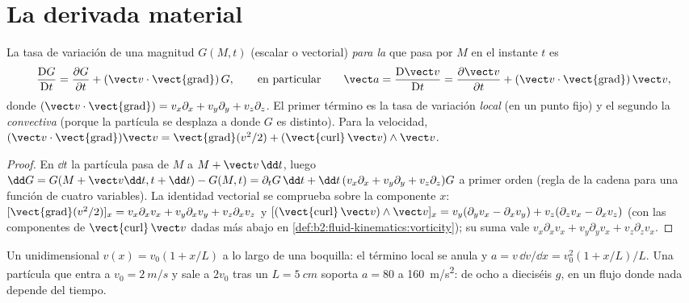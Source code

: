\section{La derivada material}

\begin{theorem}\label{thm:b2:fluid-kinematics:material}
La tasa de variación de una magnitud $G(M, t)$ (escalar o vectorial)
\emph{para la } que pasa por $M$ en el instante $t$ es
\[
\frac{\mathrm DG}{\mathrm Dt} = \frac{\partial G}{\partial t} + (\vect v\cdot
\operatorname{\vect{grad}})\,G ,
\qquad\text{en particular}\qquad
\vect a = \frac{\mathrm D\vect v}{\mathrm Dt} = \frac{\partial\vect v}{\partial t} +
(\vect v\cdot\operatorname{\vect{grad}})\,\vect v ,
\]
donde $(\vect v\cdot\operatorname{\vect{grad}}) = v_x\partial_x + v_y\partial_y +
v_z\partial_z$. El primer término es la tasa de variación \emph{local} (en un
punto fijo) y el segundo la \emph{convectiva} (porque la partícula se
desplaza a donde $G$ es distinto). Para la velocidad, $(\vect v\cdot
\operatorname{\vect{grad}})\vect v = \operatorname{\vect{grad}}(v^2/2) +
(\operatorname{\vect{curl}}\vect v)\wedge\vect v$.
\end{theorem}

\begin{proof}
En $\dd t$ la partícula pasa de $M$ a $M + \vect v\,\dd t$, luego $\dd G =
G(M + \vect v\dd t, t + \dd t) - G(M, t) = \partial_tG\,\dd t + \dd t\,(v_x\partial_x
+ v_y\partial_y + v_z\partial_z)G$ a primer orden (regla de la cadena para una
función de cuatro variables). La identidad vectorial se comprueba sobre la
componente $x$: $[\operatorname{\vect{grad}}(v^2/2)]_x = v_x\partial_xv_x + v_y\partial_x
v_y + v_z\partial_xv_z$ y $[(\operatorname{\vect{curl}}\vect v)\wedge\vect v]_x =
v_y(\partial_yv_x - \partial_xv_y) + v_z(\partial_zv_x - \partial_xv_z)$ (con las
componentes de $\operatorname{\vect{curl}}\vect v$ dadas más abajo en
\cref{def:b2:fluid-kinematics:vorticity}); su suma vale $v_x\partial_xv_x +
v_y\partial_yv_x + v_z\partial_zv_x$.
\end{proof}

\begin{example}\label{ex:b2:fluid-kinematics:nozzle}
Un  unidimensional $v(x) = v_0(1 + x/L)$ a lo largo de
una boquilla: el término local se anula y $a = v\,\dd v/\dd x = v_0^2(1 + x/L)/L$.
Una partícula que entra a $v_0 = \qty{2}{m/s}$ y sale a $2v_0$ tras un $L
= \qty{5}{cm}$ soporta $a = 80$ a \qty{160}{m/s^2}: de ocho a dieciséis $g$,
en un flujo donde nada depende del tiempo.
\end{example}

